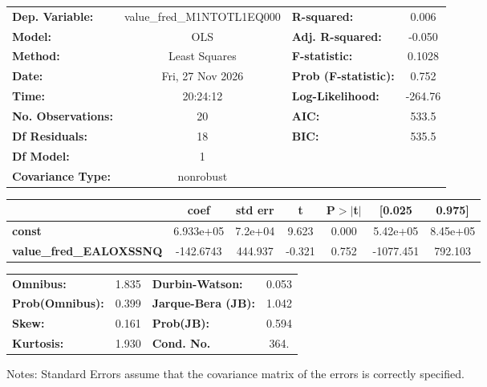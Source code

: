 \begin{center}
\begin{tabular}{lclc}
\toprule
\textbf{Dep. Variable:}         & value\_fred\_M1NTOTL1EQ000 & \textbf{  R-squared:         } &     0.006   \\
\textbf{Model:}                 &            OLS             & \textbf{  Adj. R-squared:    } &    -0.050   \\
\textbf{Method:}                &       Least Squares        & \textbf{  F-statistic:       } &    0.1028   \\
\textbf{Date:}                  &      Fri, 27 Nov 2026      & \textbf{  Prob (F-statistic):} &    0.752    \\
\textbf{Time:}                  &          20:24:12          & \textbf{  Log-Likelihood:    } &   -264.76   \\
\textbf{No. Observations:}      &               20           & \textbf{  AIC:               } &     533.5   \\
\textbf{Df Residuals:}          &               18           & \textbf{  BIC:               } &     535.5   \\
\textbf{Df Model:}              &                1           & \textbf{                     } &             \\
\textbf{Covariance Type:}       &         nonrobust          & \textbf{                     } &             \\
\bottomrule
\end{tabular}
\begin{tabular}{lcccccc}
                                & \textbf{coef} & \textbf{std err} & \textbf{t} & \textbf{P$> |$t$|$} & \textbf{[0.025} & \textbf{0.975]}  \\
\midrule
\textbf{const}                  &    6.933e+05  &      7.2e+04     &     9.623  &         0.000        &     5.42e+05    &     8.45e+05     \\
\textbf{value\_fred\_EALOXSSNQ} &    -142.6743  &      444.937     &    -0.321  &         0.752        &    -1077.451    &      792.103     \\
\bottomrule
\end{tabular}
\begin{tabular}{lclc}
\textbf{Omnibus:}       &  1.835 & \textbf{  Durbin-Watson:     } &    0.053  \\
\textbf{Prob(Omnibus):} &  0.399 & \textbf{  Jarque-Bera (JB):  } &    1.042  \\
\textbf{Skew:}          &  0.161 & \textbf{  Prob(JB):          } &    0.594  \\
\textbf{Kurtosis:}      &  1.930 & \textbf{  Cond. No.          } &     364.  \\
\bottomrule
\end{tabular}
\end{center}

Notes: \newline
 [1] Standard Errors assume that the covariance matrix of the errors is correctly specified.